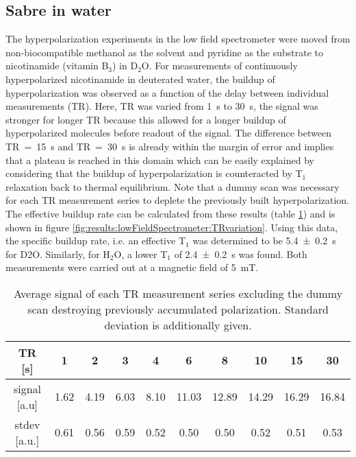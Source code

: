     \subsection{Sabre in water}
    The hyperpolarization experiments in the low field spectrometer were moved from non-biocompatible methanol as the solvent and pyridine as the substrate to nicotinamide (vitamin B$_3$) in D$_2$O. For measurements of continuously hyperpolarized nicotinamide in deuterated water, the buildup of hyperpolarization was observed as a function of the delay between individual measurements (TR). Here, TR was varied from \SI{1}{\second} to \SI{30}{\second}, the signal was stronger for longer TR because this allowed for a longer buildup of hyperpolarized molecules before readout of the signal. The difference between TR~=~\SI{15}{\second} and TR~=~\SI{30}{\second} is already within the margin of error and implies that a plateau is reached in this domain which can be easily explained by considering that the buildup of hyperpolarization is counteracted by T$_1$ relaxation back to thermal equilibrium. Note that a dummy scan was necessary for each TR measurement series to deplete the previously built hyperpolarization. The effective buildup rate can be calculated from these results (table \ref{table:results:TRvariation}) and is shown in figure \ref{fig:results:lowFieldSpectrometer:TRvariation}. Using this data, the specific buildup rate, i.e. an effective T$_1$ was determined to be \SI{5.4\pm 0.2}{\second} for D2O. Similarly, for $\mathrm{H}_2\mathrm{O}$, a lower T$_1$ of \SI{2.4\pm0.2}{\second} was found. Both measurements were carried out at a magnetic field of \SI{5}{\milli\tesla}.
        \begin{table}
            \centering
            \begin{tabular}{|c|ccccccccc|}
                \hline
                TR [s] & 1 & 2 & 3 & 4 & 6 & 8 & 10 & 15 & 30 \\
                \hline
                signal [a.u] & 1.62 & 4.19 & 6.03 & 8.10 & 11.03 & 12.89 & 14.29 & 16.29 & 16.84\\
                stdev [a.u.] & 0.61 & 0.56 & 0.59 & 0.52 & 0.50 & 0.50& 0.52 & 0.51 & 0.53\\
                \hline
            \end{tabular}
            \caption[TR-variation results]{Average signal of each TR measurement series excluding the dummy scan destroying previously accumulated polarization. Standard deviation is additionally given.}
            \label{table:results:TRvariation}
        \end{table}
